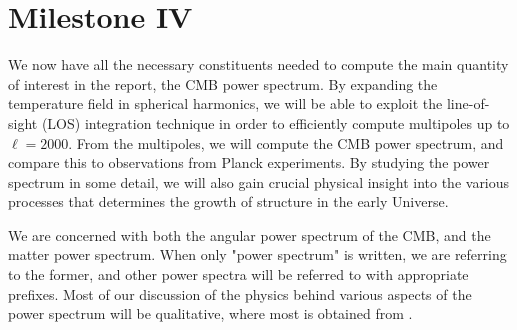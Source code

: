 \section{Milestone IV}\label{sec:M4}
We now have all the necessary constituents needed to compute the main quantity of interest in the report, the CMB power spectrum. By expanding the temperature field in spherical harmonics, we will be able to exploit the line-of-sight (LOS) integration technique in order to efficiently compute multipoles up to $\ell=2000$. From the multipoles, we will compute the CMB power spectrum, and compare this to observations from Planck experiments. By studying the power spectrum in some detail, we will also gain crucial physical insight into the various processes that determines the growth of structure in the early Universe. 

We are concerned with both the angular power spectrum of the CMB, and the matter power spectrum. When only "power spectrum" is written, we are referring to the former, and other power spectra will be referred to with appropriate prefixes. Most of our discussion of the physics behind various aspects of the power spectrum will be qualitative, where most is obtained from \cite[Ch. 9]{Dodelson}.     




 